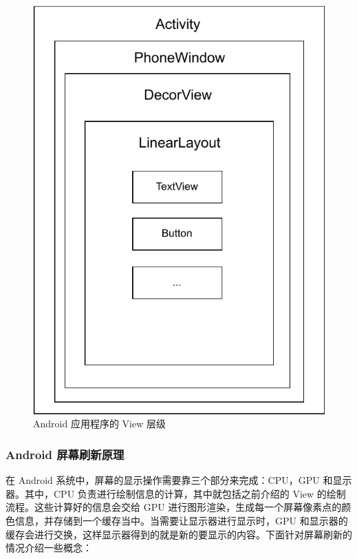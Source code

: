 \begin{figure}
    \centering
    \includegraphics[scale=0.7]{assets/view-hierarchy.pdf}
    \caption{Android 应用程序的 View 层级}
\end{figure}

\subsubsection*{Android 屏幕刷新原理}

在 Android 系统中，屏幕的显示操作需要靠三个部分来完成：CPU，GPU 和显示器。其中，CPU 负责进行绘制信息的计算，其中就包括之前介绍的 View 的绘制流程。这些计算好的信息会交给 GPU 进行图形渲染，生成每一个屏幕像素点的颜色信息，并存储到一个缓存当中。当需要让显示器进行显示时，GPU 和显示器的缓存会进行交换，这样显示器得到的就是新的要显示的内容。下面针对屏幕刷新的情况介绍一些概念：

